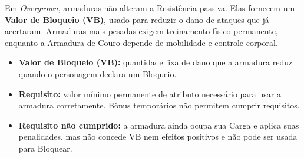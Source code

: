 
Em \textit{Overgrown}, armaduras não alteram a Resistência passiva. Elas fornecem um \textbf{Valor de Bloqueio (VB)}, usado para reduzir o dano de ataques que já acertaram. Armaduras mais pesadas exigem treinamento físico permanente, enquanto a Armadura de Couro depende de mobilidade e controle corporal.

\begin{itemize}
    \item \textbf{Valor de Bloqueio (VB):} quantidade fixa de dano que a armadura reduz quando o personagem declara um Bloqueio.
    \item \textbf{Requisito:} valor mínimo permanente de atributo necessário para usar a armadura corretamente. Bônus temporários não permitem cumprir requisitos.
    \item \textbf{Requisito não cumprido:} a armadura ainda ocupa sua Carga e aplica suas penalidades, mas não concede VB nem efeitos positivos e não pode ser usada para Bloquear.
\end{itemize}

